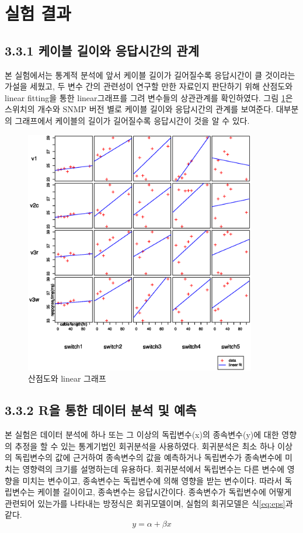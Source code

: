 \documentclass[11pt
  , a4paper
  , article
  , oneside
]{memoir}
\begin{document}
\clearpage
\section{실험 결과}
\subsection{3.3.1 케이블 길이와 응답시간의 관계}
본 실험에서는 통계적 분석에 앞서 케이블 길이가 길어질수록 응답시간이 클 것이라는 가설을 세웠고, 두 변수 간의 관련성이 연구할 만한 자료인지 판단하기 위해 산점도와 linear fitting을 통한 linear그래프를 그려 변수들의 상관관계를 확인하였다. 그림 \ref{fig:linear}은 스위치의 개수와 SNMP 버전 별로 케이블 길이와 응답시간의 관계를 보여준다. 대부분의 그래프에서 케이블의 길이가 길어질수록 응답시간이 것을 알 수 있다.

\begin{figure}[!htb]
  \centering
  \includegraphics[width=0.9\textwidth]{./images/sleep1_switch.eps}
  \caption{산점도와 linear 그래프}
  \label{fig:linear}   
\end{figure}

\clearpage

\subsection{3.3.2 R을 통한 데이터 분석 및 예측}
본 실험은 데이터 분석에 하나 또는 그 이상의 독립변수(x)의 종속변수(y)에 대한 영향의 추정을 할 수 있는 통계기법인 회귀분석을 사용하였다\citep{analysis}. 회귀분석은 최소 하나 이상의 독립변수의 값에 근거하여 종속변수의 값을 예측하거나 독립변수가 종속변수에 미치는 영향력의 크기를 설명하는데 유용하다. 회귀분석에서 독립변수는 다른 변수에 영향을 미치는 변수이고, 종속변수는 독립변수에 의해 영향을 받는 변수이다. 따라서 독립변수는 케이블 길이이고, 종속변수는 응답시간이다. 종속변수가 독립변수에 어떻게 관련되어 있는가를 나타내는 방정식은 회귀모델이며, 실험의 회귀모델은 식\ref{eq:eps}과 같다. 
\begin{equation} \label{eq:eps}
  y=\alpha + \beta x 
\end{equation}
\end{document}
